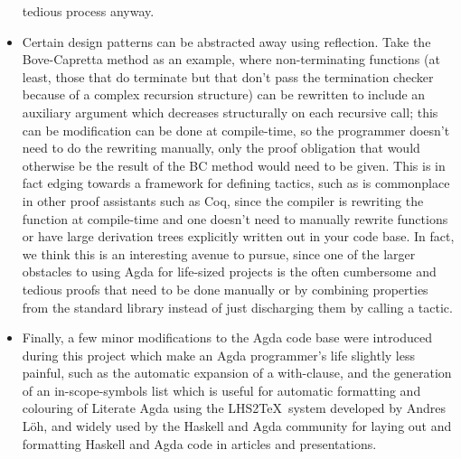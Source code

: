 \documentclass[a4paper]{article}
\begin{document}
\begin{itemize}
tedious process anyway.
  \item Certain design patterns can be abstracted away using
reflection. Take the Bove-Capretta method as an example, where
non-terminating functions (at least, those that do terminate but that
don't pass the termination checker because of a complex recursion
structure) can be rewritten to include an auxiliary argument which
decreases structurally on each recursive call; this can
be modification can be done at compile-time, so the programmer doesn't
need to do the rewriting manually, only the proof obligation that
would otherwise be
the result of the BC method would need to be given.  This is in fact
edging towards a framework for defining tactics, such as is
commonplace in other proof assistants such as Coq, since the
compiler is rewriting the function at compile-time and one doesn't
need to manually rewrite functions or have large derivation trees
explicitly written out in your code base.  In fact, we think this is
an interesting avenue to pursue, since one of the larger obstacles to
using Agda for life-sized projects is the often cumbersome and tedious
proofs that need to be done manually or by combining properties from
the standard library instead of just discharging them by calling a
tactic.
  \item Finally, a few minor modifications to the Agda code base were
introduced during this project which make an Agda programmer's life
slightly less painful, such as the automatic expansion of a
with-clause, and the generation of an in-scope-symbols list which is
useful for automatic formatting and colouring of Literate Agda using
the LHS2\TeX\ system developed by Andres L\"oh, and widely used by the
Haskell and Agda community for laying out and formatting Haskell and
Agda code in articles and presentations.
\end{itemize}




{}

\end{document}

